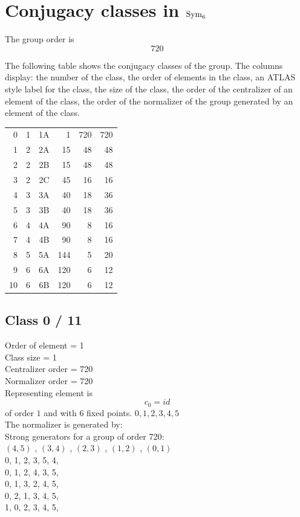\section*{Conjugacy classes in ${\rm Sym}_{6}$}
The group order is 
$$
720
$$

The following table shows the conjugacy classes of the group. The columns display: the number of the class, the order of elements in the class, an ATLAS style label for the class, the size of the class, the order of the centralizer of an element of the class, the order of the normalizer of the group generated by an element of the class.\\

\bigskip

\begin{center}
\begin{tabular}{*{6}{r}}
0 & 1 & 1A & 1 & 720 & 720\\
1 & 2 & 2A & 15 & 48 & 48\\
2 & 2 & 2B & 15 & 48 & 48\\
3 & 2 & 2C & 45 & 16 & 16\\
4 & 3 & 3A & 40 & 18 & 36\\
5 & 3 & 3B & 40 & 18 & 36\\
6 & 4 & 4A & 90 & 8 & 16\\
7 & 4 & 4B & 90 & 8 & 16\\
8 & 5 & 5A & 144 & 5 & 20\\
9 & 6 & 6A & 120 & 6 & 12\\
10 & 6 & 6B & 120 & 6 & 12\\
\end{tabular}
\end{center}

\bigskip

\bigskip
\subsection*{Class 0 / 11}
Order of element = 1\\
Class size = 1\\
Centralizer order = 720\\
Normalizer order = 720\\
Representing element is
$$c_{0} = 
id$$
of order $1$ and with 6 fixed points.
$0,1,2,3,4,5$\\
The normalizer is generated by:\\
Strong generators for a group of order 720:\\
$
(4, 5)$
, 
$
(3, 4)$
, 
$
(2, 3)$
, 
$
(1, 2)$
, 
$
(0, 1)$
\\
0, 1, 2, 3, 5, 4, \\
0, 1, 2, 4, 3, 5, \\
0, 1, 3, 2, 4, 5, \\
0, 2, 1, 3, 4, 5, \\
1, 0, 2, 3, 4, 5, \\
\bigskip
